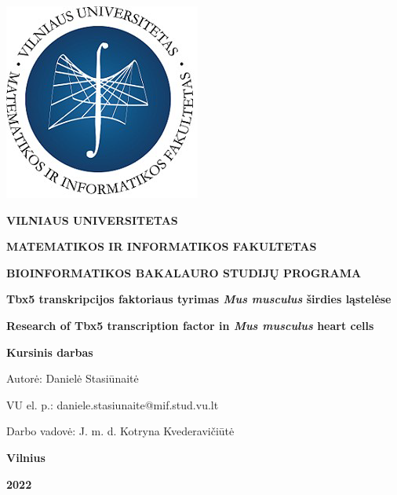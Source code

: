 \documentclass[12pt]{article}
\begin{document}

\begin{titlepage}
\vskip 20pt
\begin{center}
\includegraphics[scale=0.5]{MIF}
\end{center}


\vskip 20pt
\centerline{\bf \large \textbf{VILNIAUS UNIVERSITETAS}}
\bigskip
\centerline{\large \textbf{MATEMATIKOS IR INFORMATIKOS FAKULTETAS}}
\bigskip
\centerline{\large \textbf{BIOINFORMATIKOS BAKALAURO STUDIJŲ PROGRAMA}}

\vskip 90pt
\begin{center}
    {\bf \LARGE Tbx5 transkripcijos faktoriaus tyrimas \emph{Mus musculus}
     širdies ląstelėse}
\end{center}
\begin{center}
    {\bf \Large Research of Tbx5 transcription factor in \emph{Mus musculus}
     heart cells}
\end{center}
\vskip 20pt
\centerline{\bf \large \textbf{Kursinis darbas}}
\bigskip
\vskip 40pt

\hskip 140pt {\large Autorė: Danielė Stasiūnaitė}

\hskip 140pt{\large VU el. p.: daniele.stasiunaite@mif.stud.vu.lt}
\bigskip
\vskip 20pt

\hskip 140pt {\large Darbo vadovė: J. m. d. Kotryna Kvederavičiūtė}
\vskip 60pt
\vskip 40pt
\centerline{\large \textbf{Vilnius}}
\centerline{\large \textbf{2022}}
\newpage
\end{titlepage}



\tableofcontents
\newpage
\end{document}
